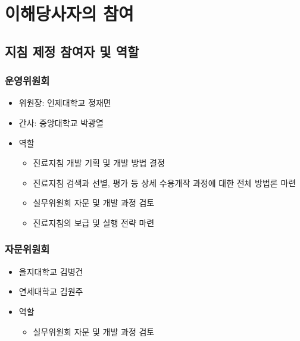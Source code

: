 \documentclass[]{book}
\providecommand{\tightlist}{%
  \setlength{\itemsep}{0pt}\setlength{\parskip}{0pt}}
\begin{document}
\hypertarget{section-28}{%
\section{이해당사자의 참여}\label{section-28}}

\hypertarget{section-29}{%
\subsection{지침 제정 참여자 및 역할}\label{section-29}}

\hypertarget{section-30}{%
\subsubsection*{운영위원회}\label{section-30}}

\begin{itemize}
\item
  위원장: 인제대학교 정재면
\item
  간사: 중앙대학교 박광열
\item
  역할

  \begin{itemize}
  \tightlist
  \item
    진료지침 개발 기획 및 개발 방법 결정
  \item
    진료지침 검색과 선별, 평가 등 상세 수용개작 과정에 대한 전체 방법론 마련
  \item
    실무위원회 자문 및 개발 과정 검토
  \item
    진료지침의 보급 및 실행 전략 마련
  \end{itemize}
\end{itemize}

\hypertarget{section-31}{%
\subsubsection*{자문위원회}\label{section-31}}

\begin{itemize}
\item
  을지대학교 김병건
\item
  연세대학교 김원주
\item
  역할

  \begin{itemize}
  \tightlist
  \item
    실무위원회 자문 및 개발 과정 검토
  \end{itemize}
\end{itemize}
\end{document}
